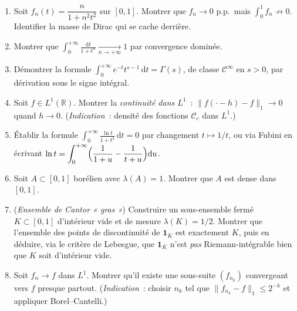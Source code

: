 \begin{mdframed}[style=exobar]
  \begin{enumerate}
    \item Soit $f_n(t) = \dfrac{n}{1+n^2 t^2}$ sur $[0,1]$. Montrer que
          $f_n \to 0$ p.p.\ mais $\int_0^1 f_n \not\to 0$. Identifier la
          masse de Dirac qui se cache derrière.

    \item Montrer que $\displaystyle\int_0^{+\infty}\frac{\mathrm{d}t}{1+t^n}
          \xrightarrow[n\to+\infty]{} 1$ par convergence dominée.

    \item Démontrer la formule
          $\displaystyle\int_0^{+\infty} e^{-t}t^{s-1}\,\mathrm{d}t = \Gamma(s)$,
          de classe $\mathcal{C}^\infty$ en $s>0$, par dérivation
          sous le signe intégral.

    \item Soit $f \in L^1(\mathbb{R})$. Montrer la \emph{continuité dans $L^1$}~:
          $\|f(\cdot - h) - f\|_1 \to 0$ quand $h\to 0$.
          (\textit{Indication}~: densité des fonctions $\mathcal{C}_c$ dans $L^1$.)

    \item Établir la formule
          $\displaystyle\int_0^{+\infty}\frac{\ln t}{1+t^2}\,\mathrm{d}t = 0$
          par changement $t \mapsto 1/t$, ou via Fubini en écrivant
          $\ln t = \displaystyle\int_0^{+\infty}\Bigl(\frac{1}{1+u}-\frac{1}{t+u}\Bigr)\mathrm{d}u$.

    \item Soit $A \subset [0,1]$ borélien avec $\lambda(A) = 1$. Montrer
          que $A$ est dense dans $[0,1]$.

    \item (\textit{Ensemble de Cantor « gras »}) Construire un sous-ensemble
          fermé $K \subset [0,1]$ d'intérieur vide et de mesure $\lambda(K) = 1/2$.
          Montrer que l'ensemble des points de discontinuité de $\mathbf{1}_K$
          est exactement $K$, puis en déduire, via le critère de Lebesgue, que
          $\mathbf{1}_K$ n'est \emph{pas} Riemann-intégrable bien que $K$ soit
          d'intérieur vide.

    \item Soit $f_n \to f$ dans $L^1$. Montrer qu'il existe une sous-suite
          $(f_{n_k})$ convergeant vers $f$ presque partout.
          (\textit{Indication}~: choisir $n_k$ tel que $\|f_{n_k}-f\|_1 \leq 2^{-k}$
          et appliquer Borel--Cantelli.)
  \end{enumerate}
\end{mdframed}

